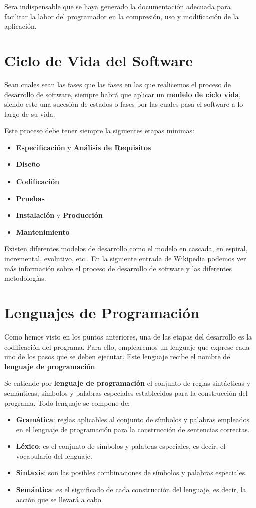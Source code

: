 Sera indispensable que se haya generado la documentación adecuada para facilitar la labor del programador en la compresión, uso y modificación de la aplicación.

\section{Ciclo de Vida del Software}
Sean cuales sean las fases que las fases en las que realicemos el proceso de desarrollo de software, siempre habrá que aplicar un \textbf{modelo de ciclo vida}, siendo este una sucesión de estados o fases por las cuales pasa el software a lo largo de su vida.

Este proceso debe tener siempre la siguientes etapas mínimas:

\begin{itemize}
    \item \textbf{Especificación} y \textbf{Análisis de Requisitos}
    \item \textbf{Diseño}
    \item \textbf{Codificación}
    \item \textbf{Pruebas}
    \item \textbf{Instalación} y \textbf{Producción}
    \item \textbf{Mantenimiento}
\end{itemize}

Existen diferentes modelos de desarrollo como el modelo en cascada, en espiral, incremental, evolutivo, etc.. En la siguiente \href{https://es.wikipedia.org/wiki/Proceso_del_desarrollo_del_software}{entrada de Wikipedia} podemos ver más información sobre el proceso de desarrollo de software y las diferentes metodologías.

\section{Lenguajes de Programación}
Como hemos visto en los puntos anteriores, una de las etapas del desarrollo es la codificación del programa. Para ello, emplearemos un lenguaje que exprese cada uno de los pasos que se deben ejecutar. Este lenguaje recibe el nombre de \textbf{lenguaje de programación}.

Se entiende por \textbf{lenguaje de programación} el conjunto de reglas sintácticas y semánticas, símbolos y palabras especiales establecidos para la construcción del programa. Todo lenguaje se compone de:

\begin{itemize}
    \item \textbf{Gramática}: reglas aplicables al conjunto de símbolos y palabras empleados en el lenguaje de programación para la construcción de sentencias correctas.
    \item \textbf{Léxico}: es el conjunto de símbolos y palabras especiales, es decir, el vocabulario del lenguaje.
    \item \textbf{Sintaxis}: son las posibles combinaciones de símbolos y palabras especiales.
    \item \textbf{Semántica}: es el significado de cada construcción del lenguaje, es decir, la acción que se llevará a cabo.
\end{itemize}

